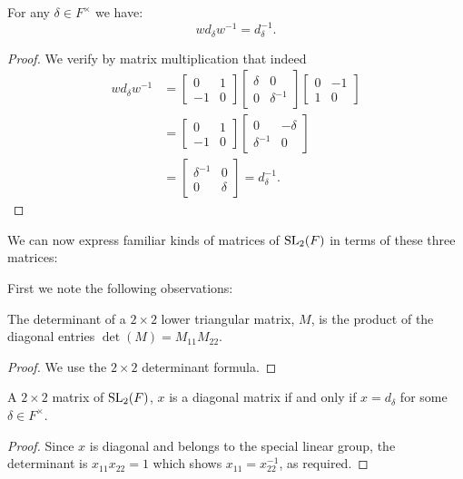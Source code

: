 \begin{lemma}
\label{SpecialMatrices.w_mul_d_eq_d_inv_w}
\leanok
For any $\delta \in F^\times$ we have:
\[ 
w d_\delta w^{-1} = d^{-1}_\delta.
\]
\end{lemma}
\begin{proof} 
\leanok
We verify by matrix multiplication that indeed
\begin{align*}
w d_\delta w^{-1} &= \begin{bmatrix} 0 & 1 \\ - 1 & 0 \end{bmatrix} \begin{bmatrix} \delta & 0 \\ 0 & \delta^{-1} \end{bmatrix} \begin{bmatrix} 0 & - 1 \\ 1 & 0 \end{bmatrix}\\
&=  \begin{bmatrix} 0 & 1 \\ - 1 & 0 \end{bmatrix} \begin{bmatrix} 0 & - \delta \\ \delta^{-1} & 0 \end{bmatrix}\\
&= \! \begin{bmatrix} \delta^{-1} & 0 \\ 0 & \delta \end{bmatrix} \!= d^{-1}_\delta. 
\end{align*}
\end{proof}


We can now express familiar kinds of matrices of $\operatorname{SL}_2(F)$ in terms of these three matrices:

First we note the following observations:
\begin{corollary}
    \label{det_eq_mul_diag_of_lower_triangular}
    \leanok
    The determinant of a $2 \times 2$ lower triangular matrix, $M$, is the product of the diagonal entries $\det(M) = M_{11} M_{22}$.
\end{corollary}
\begin{proof}
\leanok
We use the $2 \times 2$ determinant formula.
\end{proof}


\begin{corollary}
    \label{SpecialLinearGroup.fin_two_diagonal_iff}
    \leanok
    A $2 \times 2$ matrix of $\operatorname{SL}_2(F)$, $x$ is a diagonal matrix if and only if $x = d_\delta$ for some $\delta \in F^\times$.
\end{corollary}
\begin{proof}
\leanok
    Since $x$ is diagonal and belongs to the special linear group, the determinant is $x_{11} x_{22} = 1$ which shows $x_{11} = x_{22}^{-1}$, as required.
\end{proof}


